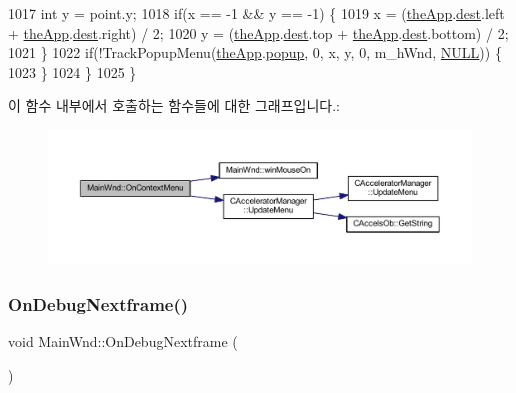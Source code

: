 \begin{DoxyCode}
1017     \textcolor{keywordtype}{int} y = point.y;
1018     \textcolor{keywordflow}{if}(x == -1 && y == -1) \{
1019       x = (\mbox{\hyperlink{_v_b_a_8cpp_a8095a9d06b37a7efe3723f3218ad8fb3}{theApp}}.\mbox{\hyperlink{class_v_b_a_aed77fc82f818810cc87c470768c75e05}{dest}}.left + \mbox{\hyperlink{_v_b_a_8cpp_a8095a9d06b37a7efe3723f3218ad8fb3}{theApp}}.\mbox{\hyperlink{class_v_b_a_aed77fc82f818810cc87c470768c75e05}{dest}}.right) / 2;
1020       y = (\mbox{\hyperlink{_v_b_a_8cpp_a8095a9d06b37a7efe3723f3218ad8fb3}{theApp}}.\mbox{\hyperlink{class_v_b_a_aed77fc82f818810cc87c470768c75e05}{dest}}.top + \mbox{\hyperlink{_v_b_a_8cpp_a8095a9d06b37a7efe3723f3218ad8fb3}{theApp}}.\mbox{\hyperlink{class_v_b_a_aed77fc82f818810cc87c470768c75e05}{dest}}.bottom) / 2;
1021     \}
1022     \textcolor{keywordflow}{if}(!TrackPopupMenu(\mbox{\hyperlink{_v_b_a_8cpp_a8095a9d06b37a7efe3723f3218ad8fb3}{theApp}}.\mbox{\hyperlink{class_v_b_a_ae9de0b5d432ad2e8a21faf040182fe03}{popup}}, 0, x, y, 0, m\_hWnd, \mbox{\hyperlink{getopt1_8c_a070d2ce7b6bb7e5c05602aa8c308d0c4}{NULL}})) \{
1023     \}
1024   \}
1025 \}
\end{DoxyCode}
이 함수 내부에서 호출하는 함수들에 대한 그래프입니다.\+:
\nopagebreak
\begin{figure}[H]
\begin{center}
\leavevmode
\includegraphics[width=350pt]{class_main_wnd_ad3e0c95642b4f96e97e699f67e6e8d39_cgraph}
\end{center}
\end{figure}
\mbox{\label{class_main_wnd_aee77d5bcdf32fa6ae1ede10345b449b3}} 
\subsubsection{\texorpdfstring{On\+Debug\+Nextframe()}{OnDebugNextframe()}}
{\footnotesize\ttfamily void Main\+Wnd\+::\+On\+Debug\+Nextframe (\begin{DoxyParamCaption}{ }\end{DoxyParamCaption})\hspace{0.3cm}{\ttfamily [protected]}}



